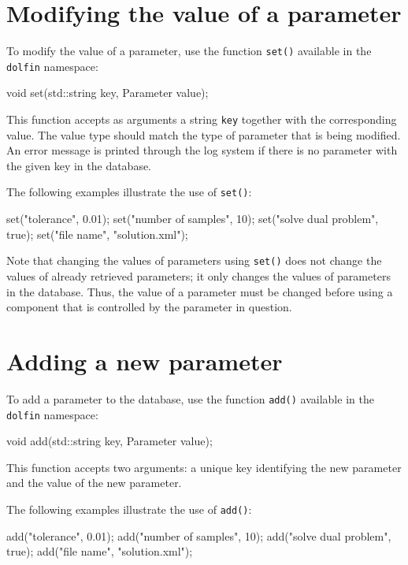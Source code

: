 \section{Modifying the value of a parameter}

To modify the value of a parameter, use the function \texttt{set()}
available in the \texttt{dolfin} namespace:
\begin{code}
void set(std::string key, Parameter value);
\end{code}
This function accepts as arguments a string \texttt{key} together with
the corresponding value. The value type should match the type of
parameter that is being modified. An error message is
printed through the log system if there is no parameter with the given
key in the database.

The following examples illustrate
the use of \texttt{set()}:
\begin{code}
set("tolerance", 0.01);
set("number of samples", 10);
set("solve dual problem", true);
set("file name", "solution.xml");
\end{code}

Note that changing the values of parameters using
\texttt{set()} does not change the values of already retrieved
parameters; it only changes the values of parameters in the
database. Thus, the value of a parameter must be changed before using
a component that is controlled by the parameter in question.

\section{Adding a new parameter}

To add a parameter to the database, use the function
\texttt{add()} available in the \texttt{dolfin}
namespace:
\begin{code}
void add(std::string key, Parameter value);
\end{code}
This function accepts two arguments:
a unique key identifying the new parameter and the value of the new
parameter.

The following examples illustrate the use of
\texttt{add()}:
\begin{code}
add("tolerance", 0.01);
add("number of samples", 10);
add("solve dual problem", true);
add("file name", "solution.xml");
\end{code}

